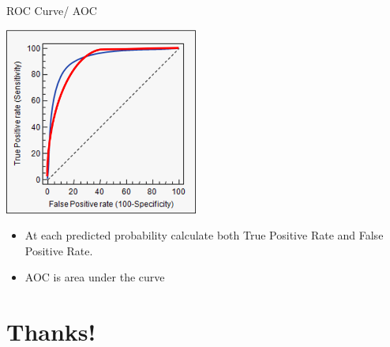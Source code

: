 \documentclass[aspectratio=169,11pt]{beamer}
\begin{document}
\begin{frame}{ROC Curve/ AOC}
\begin{center}
\includegraphics[width=2.5in]{resources/roc_curve.png}\\
\end{center}
\begin{itemize}
\item At each predicted probability calculate both \alert{True Positive Rate} and \alert{False Positive Rate}.
\item AOC is area under the curve
\end{itemize}
\end{frame}


\section{Thanks!}
\end{document}
